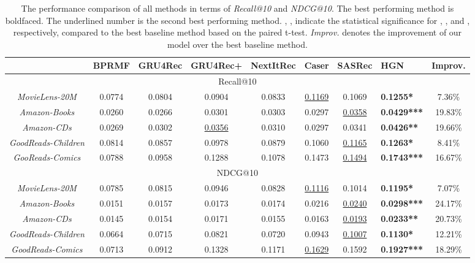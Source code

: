 \documentclass[sigconf]{acmart}
\begin{document}
\begin{table*}[ht]
\caption{\label{tab:performance_comparison}The performance comparison of all methods in terms of \textit{Recall@10} and \textit{NDCG@10}. The best performing method is boldfaced. The underlined number is the second best performing method. , ,  indicate the statistical significance for , , and , respectively, compared to the best baseline method based on the paired t-test. \textit{Improv.} denotes the improvement of our model over the best baseline method.}
\begin{tabular}{|c|c| c c c| c c| l| c|}
\hline
& \textbf{BPRMF} & \textbf{GRU4Rec} & \textbf{GRU4Rec+} & \textbf{NextItRec} & \textbf{Caser} & \textbf{SASRec} & \textbf{HGN} & \multicolumn{1}{l|}{\textbf{Improv.}} \\\hline
\multicolumn{9}{|c|}{Recall@10} \\
\hline
\textit{MovieLens-20M} & 0.0774 & 0.0804 & 0.0904 & 0.0833 & \underline{0.1169} & 0.1069 & \textbf{0.1255*} & 7.36\% \\
\textit{Amazon-Books} & 0.0260 & 0.0266 & 0.0301 & 0.0303 & 0.0297 & \underline{0.0358} & \textbf{0.0429***} & 19.83\% \\
\textit{Amazon-CDs} & 0.0269 & 0.0302 & \underline{0.0356} & 0.0310 & 0.0297 & 0.0341 & \textbf{0.0426**} & 19.66\% \\
\textit{GoodReads-Children} & 0.0814 & 0.0857 & 0.0978 & 0.0879 & 0.1060 & \underline{0.1165} & \textbf{0.1263*} & 8.41\% \\
\textit{GooReads-Comics} & 0.0788  & 0.0958 & 0.1288 & 0.1078 & 0.1473 & \underline{0.1494} & \textbf{0.1743***} & 16.67\% \\
\hline
\multicolumn{9}{|c|}{NDCG@10} \\ 
\hline
\textit{MovieLens-20M} & 0.0785 & 0.0815 & 0.0946 & 0.0828 & \underline{0.1116} & 0.1014 & \textbf{0.1195*} & 7.07\% \\
\textit{Amazon-Books} & 0.0151  & 0.0157 & 0.0173 & 0.0174 & 0.0216 & \underline{0.0240} & \textbf{0.0298***} & 24.17\% \\ 
\textit{Amazon-CDs} & 0.0145 & 0.0154 & 0.0171 & 0.0155 & 0.0163 & \underline{0.0193} & \textbf{0.0233**} & 20.73\% \\
\textit{GoodReads-Children} & 0.0664 & 0.0715 & 0.0821 & 0.0720 & 0.0943 & \underline{0.1007} & \textbf{0.1130*} & 12.21\% \\
\textit{GoodReads-Comics} & 0.0713 & 0.0912 & 0.1328 & 0.1171 & \underline{0.1629} & 0.1592 & \textbf{0.1927***} & 18.29\% \\
\hline
\end{tabular}
\vspace{-0.3cm}
\end{table*}
\end{document}
